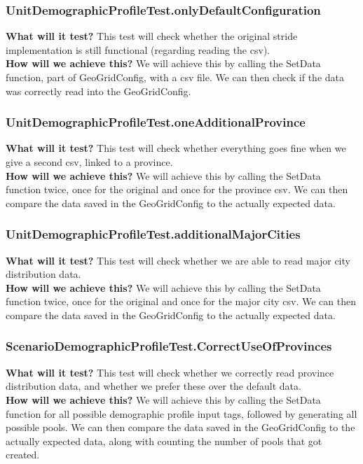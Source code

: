 \documentclass{article}
\begin{document}
\subsubsection{UnitDemographicProfileTest.onlyDefaultConfiguration} 
\textbf{What will it test?} 
This test will check whether the original stride implementation is still functional (regarding reading the csv). \\
\newline
\textbf{How will we achieve this?} 
We will achieve this by calling the SetData function, part of GeoGridConfig, with a csv file. We can then check if the data was correctly read into the GeoGridConfig.

\newpage

\subsubsection{UnitDemographicProfileTest.oneAdditionalProvince}
\textbf{What will it test?} 
This test will check whether everything goes fine when we give a second csv, linked to a province. \\
\newline
\textbf{How will we achieve this?}
We will achieve this by calling the SetData function twice, once for the original and once for the province csv. We can then compare the data saved in the GeoGridConfig to the actually expected data.

\subsubsection{UnitDemographicProfileTest.additionalMajorCities}
\textbf{What will it test?} 
This test will check whether we are able to read major city distribution data. \\
\newline
\textbf{How will we achieve this?}
We will achieve this by calling the SetData function twice, once for the original and once for the major city csv. We can then compare the data saved in the GeoGridConfig to the actually expected data.

\subsubsection{ScenarioDemographicProfileTest.CorrectUseOfProvinces}
\textbf{What will it test?} 
This test will check whether we correctly read province distribution data, and whether we prefer these over the default data. \\
\newline
\textbf{How will we achieve this?}
We will achieve this by calling the SetData function for all possible demographic profile input tags, followed by generating all possible pools. We can then compare the data saved in the GeoGridConfig to the actually expected data, along with counting the number of pools that got created.
\end{document}
